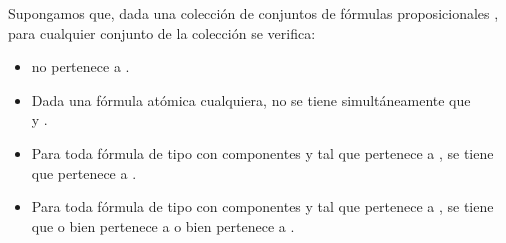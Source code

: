 \begin{isabellebody}
\begin{isamarkuptext}
\begin{demostracion}
  Supongamos que, dada una colección de conjuntos de fórmulas proposicionales , para cualquier
  conjunto  de la colección se verifica:
  \begin{itemize}
    \item \isa{{\isasymbottom}} no pertenece a .
    \item Dada  una fórmula atómica cualquiera, no se tiene 
    simultáneamente que\\  y .
    \item Para toda fórmula de tipo \isa{{\isasymalpha}} con componentes  y  tal que \isa{{\isasymalpha}}
    pertenece a , se tiene que  pertenece a .
    \item Para toda fórmula de tipo \isa{{\isasymbeta}} con componentes  y  tal que \isa{{\isasymbeta}}
    pertenece a , se tiene que o bien  pertenece a  o 
    bien  pertenece a .
  \end{itemize}


\end{demostracion}
\end{isamarkuptext}
\end{isabellebody}
